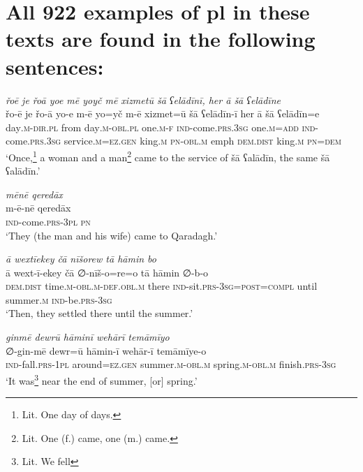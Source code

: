 \chapter{All 922 examples of pl in these texts are found in the following sentences:}

\ea \label{ZB.1}
\textit{řoē je řoā yoe mē yoyč mē xizmetū šā ʕelādīnī, her ā šā ʕelādīne} \\ 
\gll řo-ē je řo-ā yo-e m-ē yo=yč m-ē xizmet=ū šā ʕelādīn-ī her ā šā ʕelādīn=e \\ 
 day\textsc{.m}\textsc{-dir}\textsc{.pl} from day\textsc{.m}\textsc{-obl}\textsc{.pl} one\textsc{.m}\textsc{-f} \textsc{ind-}come\textsc{.prs}\textsc{.3sg} one\textsc{.m}\textsc{=add} \textsc{ind-}come\textsc{.prs}\textsc{.3sg} service\textsc{.m}\textsc{\textsc{=ez.gen}} king\textsc{.m} \textsc{pn}\textsc{-obl}\textsc{.m} emph \textsc{dem.dist} king\textsc{.m} \textsc{pn}\textsc{=dem} \\ 
\glt `Once,\footnote{Lit. One day of days.} a woman and a man\footnote{Lit. One (f.) came, one (m.) came.} came to the service of šā ʕalādīn, the same šā ʕalādīn.'
\z 
 
\ea \label{ZB.4}
\textit{mēnē qeredāx} \\ 
\gll m-ē-nē qeredāx \\ 
 \textsc{ind-}come\textsc{.prs}\textsc{-3pl} \textsc{pn} \\ 
\glt `They (the man and his wife) came to Qaradagh.'
\z 
 
\ea \label{ZB.6}
\textit{ā wextīekey čā nīšorew tā hāmin bo} \\ 
\gll ā wext-ī-ekey čā ∅-nīš-o=re=o tā hāmin ∅-b-o \\ 
 \textsc{dem.dist} time\textsc{.m}\textsc{-obl}\textsc{.m}\textsc{-def}\textsc{.obl}\textsc{.m} there \textsc{ind-}sit\textsc{.prs}\textsc{-3sg}\textsc{=\textsc{post}}\textsc{=compl} until summer\textsc{.m} \textsc{ind-}be\textsc{.prs}\textsc{-3sg} \\ 
\glt `Then, they settled there until the summer.'
\z 
 
\ea \label{ZB.7}
\textit{ginmē dewrū hāminī wehārī temāmīyo} \\ 
\gll ∅-gin-mē dewr=ū hāmin-ī wehār-ī temāmīye-o \\ 
 \textsc{ind-}fall\textsc{.prs}\textsc{-1pl} around\textsc{\textsc{=ez.gen}} summer\textsc{.m}\textsc{-obl}\textsc{.m} spring\textsc{.m}\textsc{-obl}\textsc{.m} finish\textsc{.prs}\textsc{-3sg} \\ 
\glt `It was\footnote{Lit. We fell} near the end of summer, [or] spring.'
\z 
 
